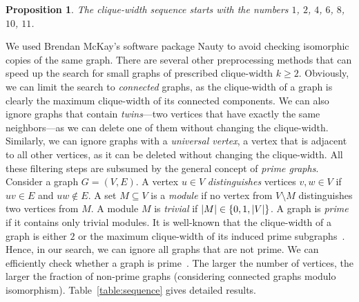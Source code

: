 \documentclass[10pt,usletter]{article}
\newtheorem{proposition}{Proposition}
\theoremstyle{remark}
\begin{document}
\begin{proposition}
  The clique-width sequence starts with the numbers $1$, $2$, $4$,
  $6$, $8$, $10$, $11$.
\end{proposition}
We used Brendan McKay's software package Nauty \cite{Mackay81} to
avoid checking isomorphic copies of the same graph.  There are several
other preprocessing methods that can speed up the search for small
graphs of prescribed clique-width $k\geq 2$.  Obviously, we can limit
the search to \emph{connected} graphs, as the clique-width of a graph
is clearly the maximum clique-width of its connected components. We
can also ignore graphs that contain \emph{twins}---two vertices
that have exactly the same neighbors---as we can delete one of them
without changing the clique-width. Similarly, we can ignore graphs
with a \emph{universal vertex}, a vertex that is adjacent to all other
vertices, as it can be deleted without changing the clique-width. All
these filtering steps are subsumed by the general concept of
\emph{prime graphs}.  Consider a graph $G=(V,E)$. A vertex $u\in V$
\emph{distinguishes} vertices $v,w\in V$ if $uv\in E$ and $uw\notin
E$. A set $M\subseteq V$ is a \emph{module} if no vertex from
$V\setminus M$ distinguishes two vertices from $M$. A module $M$ is
\emph{trivial} if $|M|\in \{0,1,|V|\}$. A graph is
\emph{prime} if it contains only trivial modules. It is well-known
that the clique-width of a graph is either $2$ or the maximum
clique-width of its induced prime
subgraphs~\cite{CourcelleOlariu00}. Hence, in our search, we can
ignore all graphs that are not prime. We can efficiently check whether a graph 
is prime~\cite{HabibPaul10}. The larger the number of
vertices, the larger the fraction of non-prime graphs (considering
connected graphs modulo isomorphism).  Table~\ref{table:sequence}
gives detailed results.



 
\end{document}
